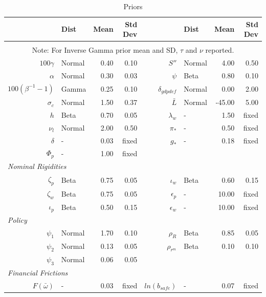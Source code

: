 \documentclass[12pt]{article}
\begin{document}
\pagestyle{empty}
\renewcommand*\footnoterule{}\vspace*{.5cm}
{\small
\begin{longtable}{rlrr@{\hspace{1in}}rlrr}
\caption{Priors}
\label{tab:param-priors}
\\ \hline
& Dist & Mean & Std Dev & & Dist & Mean & Std Dev \\ \hline
\endhead
\hline \\
\multicolumn{8}{c}{\footnotesize Note: For Inverse Gamma prior mean and SD, $\tau$ and $\nu$ reported.}
\endfoot
\multicolumn{8}{l}{\textit{Steady State}} \\[3pt]
$100\gamma$ & Normal & 0.40 & 0.10 & $S''$ & Normal & 4.00 & 0.50 \\
$\alpha$ & Normal & 0.30 & 0.03 & $\psi$ & Beta & 0.80 & 0.10 \\
$100(\beta^{-1} - 1)$ & Gamma & 0.25 & 0.10 & $\delta_{gdpdef}$ & Normal & 0.00 & 2.00 \\
$\sigma_{c}$ & Normal & 1.50 & 0.37 & $\bar{L}$ & Normal & -45.00 & 5.00 \\
$h$ & Beta & 0.70 & 0.05 & $\lambda_w$ & - & 1.50 & \scriptsize{fixed} \\
$\nu_l$ & Normal & 2.00 & 0.50 & $\pi_*$ & - & 0.50 & \scriptsize{fixed} \\
$\delta$ & - & 0.03 & \scriptsize{fixed} & $g_*$ & - & 0.18 & \scriptsize{fixed} \\
$\Phi_p$ & - & 1.00 & \scriptsize{fixed} && & & \\[3pt]
\multicolumn{8}{l}{\textit{Nominal Rigidities}} \\[3pt]
$\zeta_p$ & Beta & 0.75 & 0.05 & $\iota_w$ & Beta & 0.60 & 0.15 \\
$\zeta_w$ & Beta & 0.75 & 0.05 & $\epsilon_{p}$ & - & 10.00 & \scriptsize{fixed} \\
$\iota_p$ & Beta & 0.50 & 0.15 & $\epsilon_{w}$ & - & 10.00 & \scriptsize{fixed} \\[3pt]
\multicolumn{8}{l}{\textit{Policy}} \\[3pt]
$\psi_1$ & Normal & 1.70 & 0.10 & $\rho_R$ & Beta & 0.85 & 0.05 \\
$\psi_2$ & Normal & 0.13 & 0.05 & $\rho_{r^m}$ & Beta & 0.10 & 0.10 \\
$\psi_3$ & Normal & 0.06 & 0.05 && & & \\[3pt]
\multicolumn{8}{l}{\textit{Financial Frictions}} \\[3pt]
$F(\bar{\omega})$ & - & 0.03 & \scriptsize{fixed} & $ln(b_{safe})$ & - & 0.07 & \scriptsize{fixed} \\

\end{longtable}}
\end{document}
